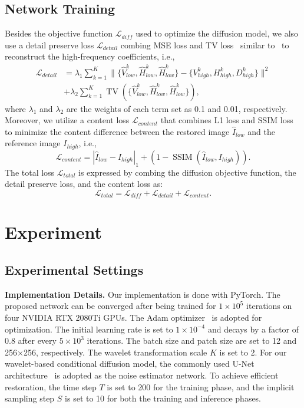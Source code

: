 \subsection{Network Training}\label{subsec:Network Training}
Besides the objective function $\mathcal{L}_{diff}$ used to optimize the diffusion model, we also use a detail preserve loss $\mathcal{L}_{detail}$ combing MSE loss and TV loss~\cite{TV} similar to~\cite{RUAS} to reconstruct the high-frequency coefficients, i.e.,
\begin{equation}\label{eq:11}
	\begin{aligned}
		\mathcal{L}_{detail} &= \lambda_{1} \sum_{k=1}^{K} \|\{\hat{V}_{low}^{k}, \hat{H}_{low}^{k}, \hat{H}_{low}^{k}\} - \{V_{high}^{k}, H_{high}^{k}, D_{high}^{k}\}\|^2 \\& + \lambda_{2} \sum_{k=1}^{K} \operatorname{TV}(\{\hat{V}_{low}^{k}, \hat{H}_{low}^{k}, \hat{H}_{low}^{k}\}),
	\end{aligned}
\end{equation}
where $\lambda_{1}$ and $\lambda_{2}$ are the weights of each term set as 0.1 and 0.01, respectively. Moreover, we utilize a content loss $\mathcal{L}_{content}$ that combines L1 loss and SSIM loss~\cite{SSIM} to minimize the content difference between the restored image $\hat{I}_{low}$ and the reference image $I_{high}$, i.e.,
\begin{equation}\label{eq:12}
	\mathcal{L}_{content} = |\hat{I}_{low} - I_{high}|_{1} + (1 - \operatorname{SSIM}(\hat{I}_{low}, I_{high})).
\end{equation}
The total loss $\mathcal{L}_{total}$ is expressed by combing the diffusion objective function, the detail preserve loss, and the content loss as:
\begin{equation}\label{eq:13}
	\mathcal{L}_{total} = \mathcal{L}_{diff} + \mathcal{L}_{detail} + \mathcal{L}_{content}.
\end{equation}

\section{Experiment}\label{sec:experiment}
\subsection{Experimental Settings}\label{subsec:Experimental Settings}
\textbf{Implementation Details.} Our implementation is done with PyTorch. The proposed network can be converged after being trained for $1\times10^{5}$ iterations on four NVIDIA RTX 2080Ti GPUs. The Adam optimizer~\cite{Adam} is adopted for optimization. The initial learning rate is set to $1\times10^{-4}$ and decays by a factor of 0.8 after every $5\times10^{3}$ iterations. The batch size and patch size are set to 12 and 256$\times$256, respectively. The wavelet transformation scale $K$ is set to 2. For our wavelet-based conditional diffusion model, the commonly used U-Net architecture~\cite{Unet} is adopted as the noise estimator network. To achieve efficient restoration, the time step $T$ is set to 200 for the training phase, and the implicit sampling step $S$ is set to 10 for both the training and inference phases. 

